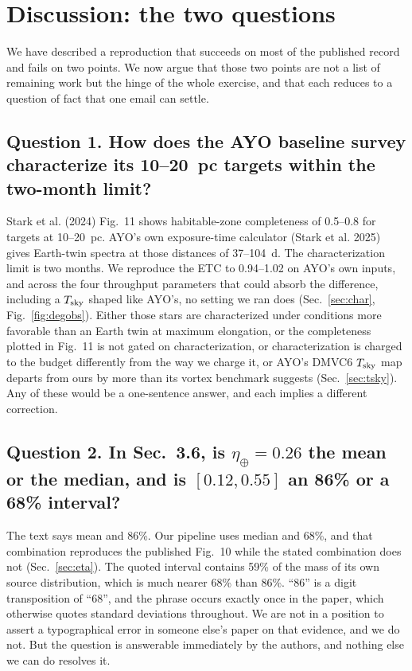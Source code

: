 \documentclass[11pt,a4paper]{article}
\begin{document}
\section{Discussion: the two questions}
\label{sec:discussion}

We have described a reproduction that succeeds on most of the published record and fails on two
points. We now argue that those two points are not a list of remaining work but the hinge of the
whole exercise, and that each reduces to a question of fact that one email can settle.

\subsection*{Question 1. How does the AYO baseline survey characterize its 10--20~pc targets
within the two-month limit?}

Stark et al. (2024) Fig.~11 shows habitable-zone completeness of 0.5--0.8 for targets at 10--20~pc.
AYO's own exposure-time calculator (Stark et al. 2025) gives Earth-twin spectra at those distances
of 37--104~d. The characterization limit is two months. We reproduce the ETC to 0.94--1.02 on
AYO's own inputs, and across the four throughput parameters that could absorb the difference,
including a $T_{\rm sky}$ shaped like AYO's, no setting we ran does (Sec.~\ref{sec:char},
Fig.~\ref{fig:degobs}). Either those stars are characterized under conditions more favorable than
an Earth twin at maximum elongation, or the completeness plotted in Fig.~11 is not gated on
characterization, or characterization is charged to the budget differently from the way we charge
it, or AYO's DMVC6 $T_{\rm sky}$ map departs from ours by more than its vortex benchmark suggests
(Sec.~\ref{sec:tsky}). Any of these would be a one-sentence answer, and each implies a different
correction.

\subsection*{Question 2. In Sec.~3.6, is $\eta_\oplus = 0.26$ the mean or the median, and is
$[0.12, 0.55]$ an 86\% or a 68\% interval?}

The text says mean and 86\%. Our pipeline uses median and 68\%, and that combination reproduces
the published Fig.~10 while the stated combination does not (Sec.~\ref{sec:eta}). The quoted
interval contains 59\% of the mass of its own source distribution, which is much
nearer 68\% than 86\%. ``86'' is a digit transposition of ``68'', and the phrase occurs exactly
once in the paper, which otherwise quotes standard deviations throughout. We are not in a position
to assert a typographical error in someone else's paper on that evidence, and we do not. But the
question is answerable immediately by the authors, and nothing else we can do resolves it.
\end{document}

